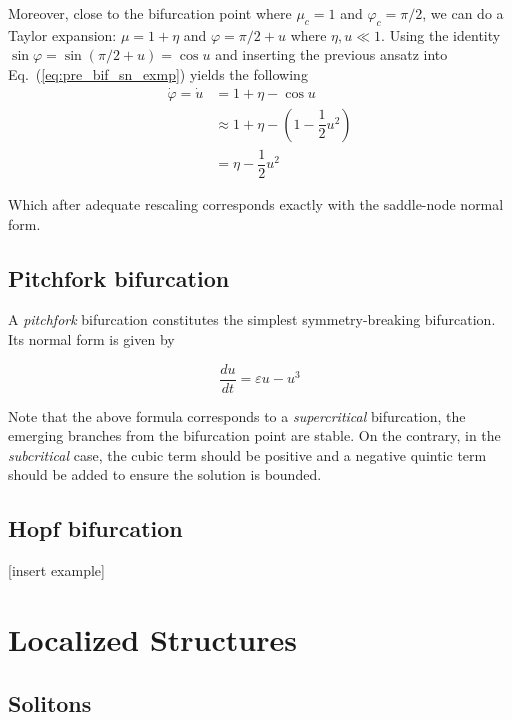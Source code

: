 \begin{exmp}
    Moreover, close to the bifurcation point where $\mu_c = 1$ and $\varphi_c = \pi/2$,
    we can do a Taylor expansion: $\mu = 1 + \eta$ and $\varphi = \pi/2 + u$ 
    where $\eta, u \ll 1$. Using the identity $\sin \varphi = \sin (\pi/2 + u) = \cos u$
    and inserting the previous ansatz into Eq.~(\ref{eq:pre_bif_sn_exmp}) yields
    the following
    \begin{align*}
        \dot{\varphi} = \dot{u} &= 1 + \eta - \cos u \\ 
        &\approx 1 + \eta - (1 - \dfrac12 u^2) \\
        &= \eta - \dfrac12 u^2
    \end{align*}

    Which after adequate rescaling corresponds exactly with the saddle-node
    normal form.
    

\end{exmp}

\subsection{Pitchfork bifurcation}

A {\em pitchfork} bifurcation constitutes the simplest symmetry-breaking bifurcation.
Its normal form is given by

\begin{equation}
    \dfrac{du}{dt} = \varepsilon u - u ^ 3
\end{equation}

Note that the above formula corresponds to a {\em supercritical} bifurcation, the emerging branches from the
bifurcation point are stable. On the contrary, in the {\em subcritical} case, the cubic
term should be positive and a negative quintic term should be added to ensure the solution is bounded.
\subsection{Hopf bifurcation}

[insert example]

\section{Localized Structures}
\label{sec:fra_LS}

\subsection{Solitons}

